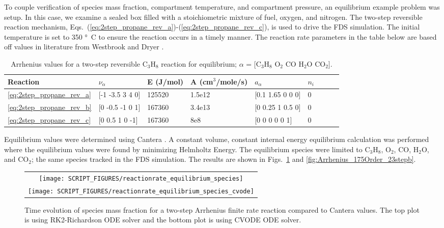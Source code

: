 \documentclass[11pt]{book}
\begin{document}
To couple verification of species mass fraction, compartment temperature, and compartment pressure, an equilibrium example problem was setup. In this case, we examine a sealed box filled with a stoichiometric mixture of fuel, oxygen, and nitrogen. The two-step reversible reaction mechanism, Eqs.~(\ref{eq:2step_propane_rev_a})-(\ref{eq:2step_propane_rev_c}), is used to drive the FDS simulation. The initial temperature is set to 350 \si{\degree C} to ensure the reaction occurs in a timely manner. The reaction rate parameters in the table below are based off values in literature from Westbrook and Dryer \cite{Westbrook:1}.
\begin{table}[ht]
\begin{center}
\caption[Arrhenius values for a two-step reversible C$_3$H$_8$ reaction]{Arrhenius values for a two-step reversible C$_3$H$_8$ reaction for equilibrium; $\alpha$ = [$\mathrm{C_3H_8}$ $\mathrm{O_2}$ $\mathrm{CO}$ $\mathrm{H_2O}$ $\mathrm{CO_2}$].}
\label{two_step_eq_rev_c3h8}
\begin{tabular}{|l|l|l|l|l|l|l|l|l|}
\hline Reaction & $\nu_{\alpha}$ & E (J/mol) & A (cm$^3$/mole/s) & $a_{\alpha}$ & $n_i$  \\ \hline \hline
\ref{eq:2step_propane_rev_a} & [-1 -3.5 3 4 0] & 125520 & 1.5e12 & [0.1 1.65 0 0 0] & 0 \\ \hline
\ref{eq:2step_propane_rev_b} & [0 -0.5 -1 0 1] & 167360 & 3.4e13 & [0 0.25 1 0.5 0] & 0 \\ \hline
\ref{eq:2step_propane_rev_c} & [0 0.5 1 0 -1]  & 167360 & 8e8    & [0 0 0 0 0 1]    & 0 \\ \hline
\end{tabular}
\end{center}
\end{table}
Equilibrium values were determined using Cantera \cite{cantera:2023}. A constant volume, constant internal energy equilibrium calculation was performed where the equilibrium values were found by minimizing Helmholtz Energy. The equilibrium species were limited to $\mathrm{C_3H_8}$, $\mathrm{O_2}$, $\mathrm{CO}$, $\mathrm{H_2O}$, and $\mathrm{CO_2}$; the same species tracked in the FDS simulation.  The results are shown in Figs.~\ref{fig:Arrhenius_2Order_1stepb} and \ref{fig:Arrhenius_175Order_23stepb}.

\begin{figure}[h!]
\centering
\begin{tabular}{c}
\texttt{[image: SCRIPT\_FIGURES/reactionrate\_equilibrium\_species]} \\
\texttt{[image: SCRIPT\_FIGURES/reactionrate\_equilibrium\_species\_cvode]}
\end{tabular}
\caption[Species evolution in an equilibrium case]{Time evolution of species mass fraction for a two-step Arrhenius finite rate reaction compared to Cantera values. The top plot is using RK2-Richardson ODE solver and the bottom plot is using CVODE ODE solver.}
\label{fig:Arrhenius_2Order_1stepb}
\end{figure}
\end{document}
